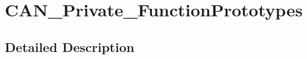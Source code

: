 \hypertarget{group___c_a_n___private___function_prototypes}{\section{C\-A\-N\-\_\-\-Private\-\_\-\-Function\-Prototypes}
\label{group___c_a_n___private___function_prototypes}
}


\subsection{Detailed Description}
